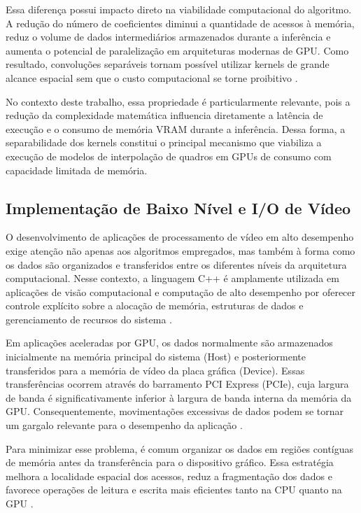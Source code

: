 \documentclass[
    12pt,                %
    openright,           %
    oneside,             %
    a4paper,             %
    english,             %
    brazil               %
]{abntex2}
\begin{document}
Essa diferença possui impacto direto na viabilidade computacional do algoritmo. A redução do número de coeficientes diminui a quantidade de acessos à memória, reduz o volume de dados intermediários armazenados durante a inferência e aumenta o potencial de paralelização em arquiteturas modernas de GPU. Como resultado, convoluções separáveis tornam possível utilizar kernels de grande alcance espacial sem que o custo computacional se torne proibitivo \cite{Niklaus2017,Kirk2023}.

No contexto deste trabalho, essa propriedade é particularmente relevante, pois a redução da complexidade matemática influencia diretamente a latência de execução e o consumo de memória VRAM durante a inferência. Dessa forma, a separabilidade dos kernels constitui o principal mecanismo que viabiliza a execução de modelos de interpolação de quadros em GPUs de consumo com capacidade limitada de memória.


\subsection{Implementação de Baixo Nível e I/O de Vídeo}

O desenvolvimento de aplicações de processamento de vídeo em alto desempenho exige atenção não apenas aos algoritmos empregados, mas também à forma como os dados são organizados e transferidos entre os diferentes níveis da arquitetura computacional. Nesse contexto, a linguagem C++ é amplamente utilizada em aplicações de visão computacional e computação de alto desempenho por oferecer controle explícito sobre a alocação de memória, estruturas de dados e gerenciamento de recursos do sistema \cite{Kirk2023}.

Em aplicações aceleradas por GPU, os dados normalmente são armazenados inicialmente na memória principal do sistema (Host) e posteriormente transferidos para a memória de vídeo da placa gráfica (Device). Essas transferências ocorrem através do barramento PCI Express (PCIe), cuja largura de banda é significativamente inferior à largura de banda interna da memória da GPU. Consequentemente, movimentações excessivas de dados podem se tornar um gargalo relevante para o desempenho da aplicação \cite{NvidiaCUDA2025}.

Para minimizar esse problema, é comum organizar os dados em regiões contíguas de memória antes da transferência para o dispositivo gráfico. Essa estratégia melhora a localidade espacial dos acessos, reduz a fragmentação dos dados e favorece operações de leitura e escrita mais eficientes tanto na CPU quanto na GPU \cite{Kirk2023}.
\end{document}
